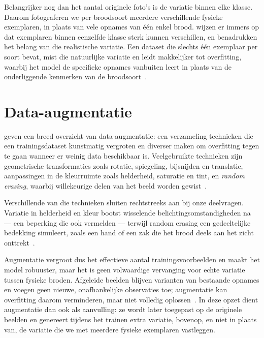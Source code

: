Belangrijker nog dan het aantal originele foto's is de variatie binnen elke klasse. Daarom
fotograferen we per broodsoort meerdere verschillende fysieke exemplaren, in plaats van
vele opnames van één enkel brood. \textcite{Wei2022} wijzen er immers op
dat exemplaren binnen eenzelfde klasse sterk kunnen verschillen, en \textcite{Boyd2024}
benadrukken het belang van die realistische variatie. Een dataset die slechts één
exemplaar per soort bevat, mist die natuurlijke variatie en leidt makkelijker tot
overfitting, waarbij het model de specifieke opnames vanbuiten leert in plaats van de
onderliggende kenmerken van de broodsoort~\autocite{Shorten2019}.


\section{Data-augmentatie}


\textcite{Shorten2019} geven een breed overzicht van data-augmentatie: een verzameling
technieken die een trainingsdataset kunstmatig vergroten en diverser maken om
overfitting tegen te gaan wanneer er weinig data beschikbaar is. Veelgebruikte
technieken zijn geometrische transformaties zoals rotatie, spiegeling, bijsnijden en
translatie, aanpassingen in de kleurruimte zoals helderheid, saturatie en tint, en
\emph{random erasing}, waarbij willekeurige delen van het beeld worden
gewist~\autocite{Shorten2019}.


Verschillende van die technieken sluiten rechtstreeks aan bij onze deelvragen. Variatie
in helderheid en kleur bootst wisselende belichtingsomstandigheden na --- een beperking
die ook \textcite{Olakanmi2023} vermelden --- terwijl random erasing een gedeeltelijke
bedekking simuleert, zoals een hand of een zak die het brood deels aan het zicht
onttrekt~\autocite{Ciapas2023}.


Augmentatie vergroot dus het effectieve aantal trainingsvoorbeelden en maakt het model
robuuster, maar het is geen volwaardige vervanging voor echte variatie tussen fysieke
broden. Afgeleide beelden blijven varianten van bestaande opnames en voegen geen nieuwe,
onafhankelijke observaties toe; augmentatie kan overfitting daarom verminderen, maar niet
volledig oplossen~\autocite{Shorten2019}. In deze opzet dient augmentatie dan ook als
aanvulling: ze wordt later toegepast op de originele
beelden en genereert tijdens het trainen extra variatie, bovenop, en niet in plaats
van, de variatie die we met meerdere fysieke exemplaren vastleggen.
